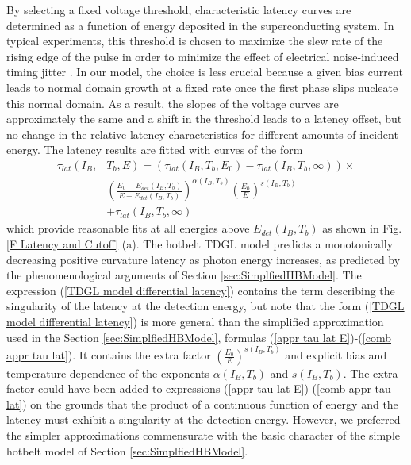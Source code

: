 \documentclass[%
reprint,
 amsmath,amssymb,
aps,
pra,
]{revtex4-1}
\begin{document}
By selecting a fixed voltage threshold, characteristic latency curves are determined as a function of energy deposited in the superconducting system.  In typical experiments, this threshold is chosen to maximize the slew rate of the rising edge of the pulse in order to minimize the effect of electrical noise-induced timing jitter \cite{korzh_demonstrating_2018}.  In our model, the choice is less crucial because a given bias current leads to normal domain growth at a fixed rate once the first phase slips nucleate this normal domain.  As a result, the slopes of the voltage curves are approximately the same and a shift in the threshold leads to a latency offset, but no change in the relative latency characteristics for different amounts of incident energy.  The latency results are fitted with curves of the form 
\begin{equation}\label{TDGL model differential latency}
\begin{aligned}
\tau_{lat}\left(I_B, \right.&\left.T_b, E\right) = \left(\tau_{lat}\left(I_B,T_b,E_0\right) - \tau_{lat}\left(I_B,T_b,\infty\right)\right)\times \\
&{\left(\frac{E_0 - E_{det}\left(I_B,T_b\right)}{E - E_{det}\left(I_B,T_b\right)} \right)}^{\alpha\left(I_B,T_b\right)}{\left(\frac{E_0}{E}\right)}^{s\left(I_B,T_b\right)}\\
&+ \tau_{lat}\left(I_B,T_b,\infty \right)
\end{aligned}     
\end{equation}
which provide reasonable fits at all energies above \(E_{det}\left(I_B,T_b\right)\) as shown in Fig. \ref{F Latency and Cutoff} (a).  The hotbelt TDGL model predicts a monotonically decreasing positive curvature latency as photon energy increases, as predicted by the phenomenological arguments of Section \ref{sec:SimplfiedHBModel}.  The expression (\ref{TDGL model differential latency}) contains the term describing the singularity of the latency at the detection energy, but note that the form (\ref{TDGL model differential latency}) is more general than the simplified approximation used in the Section \ref{sec:SimplfiedHBModel}, formulas (\ref{appr tau lat E})-(\ref{comb appr tau lat}). It contains the extra factor 
\({\left(\frac{E_0}{E}\right)}^{s\left(I_B,T_b\right)}\) and explicit bias and temperature dependence of the exponents \(\alpha\left(I_B,T_b\right)\) and \(s\left(I_B,T_b\right)\).  The extra factor could have been added to expressions (\ref{appr tau lat E})-(\ref{comb appr tau lat}) on the grounds that the product of a continuous function of energy and the latency must exhibit a singularity at the detection energy.  However, we preferred the simpler approximations commensurate with the basic character of the simple hotbelt model of Section \ref{sec:SimplfiedHBModel}. 
\end{document}

